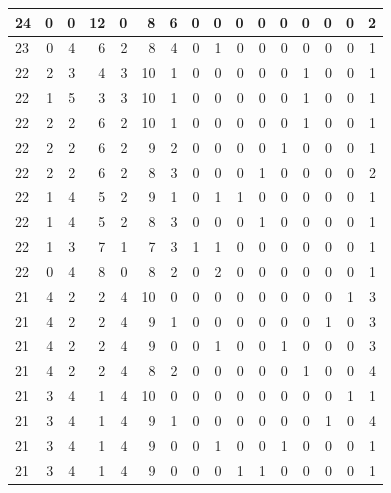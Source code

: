 \begin{appendix}
{\begin{longtable}{lrrrrrrrrrrrrrrr}
    24        & 0  & 0  & 12 & 0  & 8  & 6  & 0  & 0  & 0  & 0  & 0  & 0   & 0   & 0   & 2    \\\midrule
    23        & 0  & 4  & 6  & 2  & 8  & 4  & 0  & 1  & 0  & 0  & 0  & 0   & 0   & 0   & 1    \\\midrule
    22        & 2  & 3  & 4  & 3  & 10 & 1  & 0  & 0  & 0  & 0  & 0  & 1   & 0   & 0   & 1    \\
    22        & 1  & 5  & 3  & 3  & 10 & 1  & 0  & 0  & 0  & 0  & 0  & 1   & 0   & 0   & 1    \\
    22        & 2  & 2  & 6  & 2  & 10 & 1  & 0  & 0  & 0  & 0  & 0  & 1   & 0   & 0   & 1    \\
    22        & 2  & 2  & 6  & 2  & 9  & 2  & 0  & 0  & 0  & 0  & 1  & 0   & 0   & 0   & 1    \\
    22        & 2  & 2  & 6  & 2  & 8  & 3  & 0  & 0  & 0  & 1  & 0  & 0   & 0   & 0   & 2    \\
    22        & 1  & 4  & 5  & 2  & 9  & 1  & 0  & 1  & 1  & 0  & 0  & 0   & 0   & 0   & 1    \\
    22        & 1  & 4  & 5  & 2  & 8  & 3  & 0  & 0  & 0  & 1  & 0  & 0   & 0   & 0   & 1    \\
    22        & 1  & 3  & 7  & 1  & 7  & 3  & 1  & 1  & 0  & 0  & 0  & 0   & 0   & 0   & 1    \\
    22        & 0  & 4  & 8  & 0  & 8  & 2  & 0  & 2  & 0  & 0  & 0  & 0   & 0   & 0   & 1    \\\midrule
    21        & 4  & 2  & 2  & 4  & 10 & 0  & 0  & 0  & 0  & 0  & 0  & 0   & 0   & 1   & 3    \\
    21        & 4  & 2  & 2  & 4  & 9  & 1  & 0  & 0  & 0  & 0  & 0  & 0   & 1   & 0   & 3    \\
    21        & 4  & 2  & 2  & 4  & 9  & 0  & 0  & 1  & 0  & 0  & 1  & 0   & 0   & 0   & 3    \\
    21        & 4  & 2  & 2  & 4  & 8  & 2  & 0  & 0  & 0  & 0  & 0  & 1   & 0   & 0   & 4    \\
    21        & 3  & 4  & 1  & 4  & 10 & 0  & 0  & 0  & 0  & 0  & 0  & 0   & 0   & 1   & 1    \\
    21        & 3  & 4  & 1  & 4  & 9  & 1  & 0  & 0  & 0  & 0  & 0  & 0   & 1   & 0   & 4    \\
    21        & 3  & 4  & 1  & 4  & 9  & 0  & 0  & 1  & 0  & 0  & 1  & 0   & 0   & 0   & 1    \\
    21        & 3  & 4  & 1  & 4  & 9  & 0  & 0  & 0  & 1  & 1  & 0  & 0   & 0   & 0   & 1    \\

\end{longtable}}
\end{appendix}
